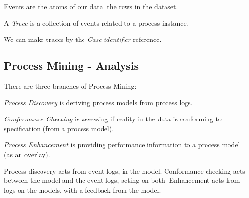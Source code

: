 Events are the atoms of our data, the rows in the dataset.

\begin{definition}
	A \emph{Trace} is a collection of events related to a process instance.
\end{definition}

We can make traces by the \emph{Case identifier} reference.

\subsection*{Process Mining - Analysis}

There are three branches of Process Mining:

\begin{definition}
	\emph{Process Discovery} is deriving process models from process logs.
\end{definition}

\begin{definition}
	\emph{Conformance Checking} is assessing if reality in the data is conforming to specification (from a process model).
\end{definition}

\begin{definition}
	\emph{Process Enhancement} is providing performance information to a process model (as an overlay).
\end{definition}

Process discovery acts from event logs, in the model. Conformance checking acts between the model and the event logs, acting on both. Enhancement acts from logs on the models, with a feedback from the model.

